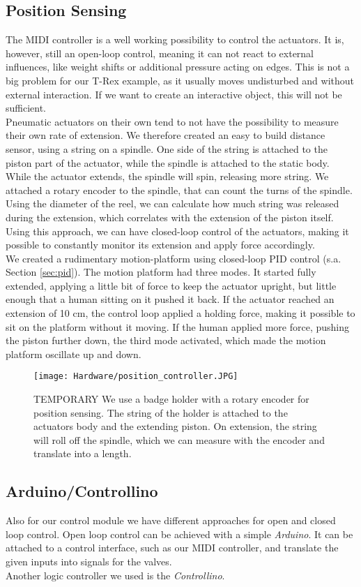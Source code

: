 \subsection{Position Sensing}
The MIDI controller is a well working possibility to control the actuators. It is, however, still an open-loop control, meaning it can not react to external influences, like weight shifts or additional pressure acting on edges. This is not a big problem for our T-Rex example, as it usually moves undisturbed and without external interaction. If we want to create an interactive object, this will not be sufficient.\\
Pneumatic actuators on their own tend to not have the possibility to measure their own rate of extension. We therefore created an easy to build distance sensor, using a string on a spindle. One side of the string is attached to the piston part of the actuator, while the spindle is attached to the static body. While the actuator extends, the spindle will spin, releasing more string. We attached a rotary encoder to the spindle, that can count the turns of the spindle. Using the diameter of the reel, we can calculate how much string was released during the extension, which correlates with the extension of the piston itself.\\
Using this approach, we can have closed-loop control of the actuators, making it possible to constantly monitor its extension and apply force accordingly.\\
We created a rudimentary motion-platform using closed-loop PID control (s.a. Section \ref{sec:pid}). The motion platform had three modes. It started fully extended, applying a little bit of force to keep the actuator upright, but little enough that a human sitting on it pushed it back. If the actuator reached an extension of 10 cm, the control loop applied a holding force, making it possible to sit on the platform without it moving. If the human applied more force, pushing the piston further down, the third mode activated, which made the motion platform oscillate up and down.

\begin{figure}[h!]
    \texttt{[image: Hardware/position\_controller.JPG]}
    \centering
    \caption{TEMPORARY We use a badge holder with a rotary encoder for position sensing. The string of the holder is attached to the actuators body and the extending piston. On extension, the string will roll off the spindle, which we can measure with the encoder and translate into a length.}
    \label{fig:position_control}
\end{figure}

\subsection{Arduino/Controllino}
Also for our control module we have different approaches for open and closed loop control. Open loop control can be achieved with a simple \textit{Arduino}. It can be attached to a control interface, such as our MIDI controller, and translate the given inputs into signals for the valves.\\
Another logic controller we used is the \textit{Controllino}.
